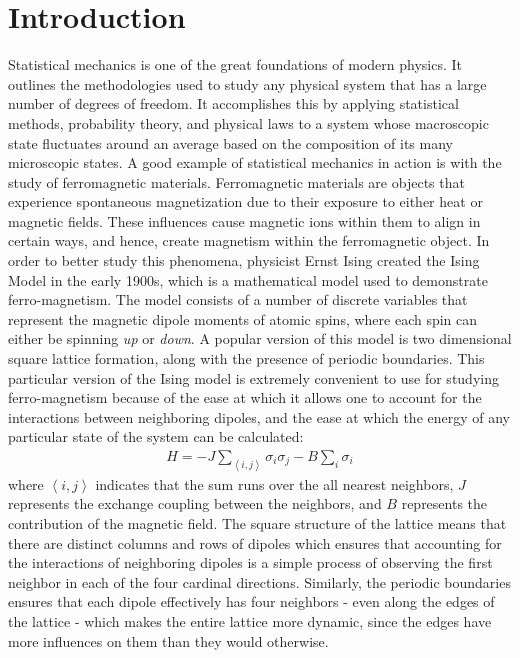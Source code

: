 \documentclass[twocolumn]{article}
\begin{document}
\section{Introduction} 
\hspace{\parindent} Statistical mechanics is one of the great foundations of modern physics. It outlines the methodologies used to study any physical system that has a large number of degrees of freedom. It accomplishes this by applying statistical methods, probability theory, and physical laws to a system whose macroscopic state fluctuates around an average based on the composition of its many microscopic states. A good example of statistical mechanics in action is with the study of ferromagnetic materials. Ferromagnetic materials are objects that experience spontaneous magnetization due to their exposure to either heat or magnetic fields. These influences cause magnetic ions within them to align in certain ways, and hence, create magnetism within the ferromagnetic object. In order to better study this phenomena, physicist Ernst Ising created the Ising Model in the early 1900s, which is a mathematical model used to demonstrate ferro-magnetism. The model consists of a number of discrete variables that represent the magnetic dipole moments of atomic spins, where each spin can either be spinning \textit{up} or \textit{down}. A popular version of this model is two dimensional square lattice formation, along with the presence of periodic boundaries. This particular version of the Ising model is extremely convenient to use for studying ferro-magnetism because of the ease at which it allows one to account for the interactions between neighboring dipoles, and the ease at which the energy of any particular state of the system can be calculated:
\begin{align}
H=-J\sum_{\left<i,j\right>}^{}\sigma_i\sigma_j-B\sum_{i}^{}\sigma_i
\end{align}
where $\left<i,j\right>$ indicates that the sum runs over the all nearest neighbors, $J$ represents the exchange coupling between the neighbors, and $B$ represents the contribution of the magnetic field. The square structure of the lattice means that there are distinct columns and rows of dipoles which ensures that accounting for the interactions of neighboring dipoles is a simple process of observing the first neighbor in each of the four cardinal directions. Similarly, the periodic boundaries ensures that each dipole effectively has four neighbors - even along the edges of the lattice - which makes the entire lattice more dynamic, since the edges have more influences on them than they would otherwise.
\end{document}
